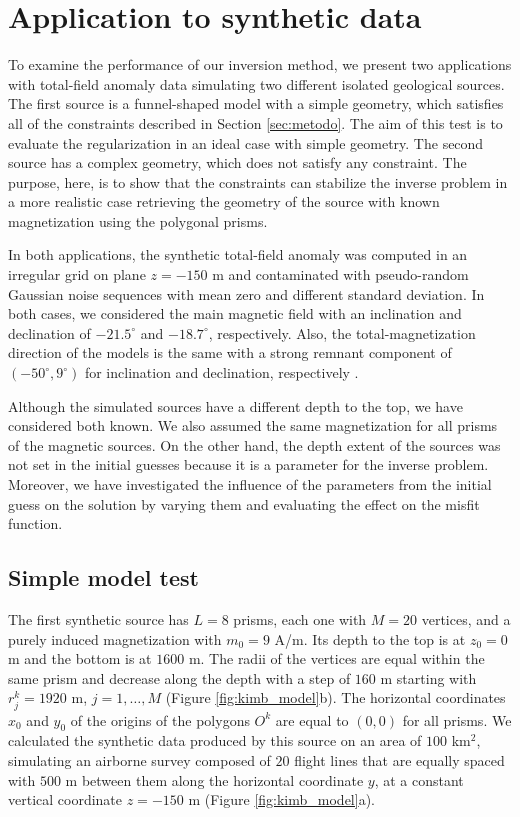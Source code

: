 \section{Application to synthetic data}

To examine the performance of our inversion method, we present two applications with total-field anomaly data simulating two different isolated geological sources. The first source is a funnel-shaped model with a simple geometry, which satisfies all of the constraints described in Section \ref{sec:metodo}. The aim of this test is to evaluate the regularization in an ideal case with simple geometry. The second source has a complex geometry, which does not satisfy any constraint. The purpose, here, is to show that the constraints can stabilize the inverse problem in a more realistic case retrieving the geometry of the source with known magnetization using the polygonal prisms.

In both applications, the synthetic total-field anomaly was computed in an irregular grid on plane $z=-150$ m and contaminated with pseudo-random Gaussian noise sequences with mean zero and different standard deviation. In both cases, we considered the main magnetic field with an inclination and declination of $-21.5^\circ$ and $-18.7^\circ$, respectively. Also, the total-magnetization direction of the models is the same with a strong remnant component of $(-50^\circ,9^\circ)$ for inclination and declination, respectively .

Although the simulated sources have a different depth to the top, we have considered both known. We also assumed the same magnetization for all prisms of the magnetic sources. On the other hand, the depth extent of the sources was not set in the initial guesses because it is a parameter for the inverse problem. Moreover, we have investigated the influence of the parameters from the initial guess on the solution by varying them and evaluating the effect on the misfit function.

\subsection{Simple model test}

The first synthetic source has $L=8$ prisms, each one with $M = 20$ vertices, and a purely induced magnetization with $m_0 = 9$ A/m. Its depth to the top is at $z_0=0$ m and the bottom is at $1600$ m. The radii of the vertices are equal within the same prism and decrease along the depth with a step of $160$ m starting with $r_j^k=1920$ m, $j=1,\dots, M$ (Figure \ref{fig:kimb_model}b). The horizontal coordinates $x_0$ and $y_0$ of the origins of the polygons $O^k$ are equal to $(0,0)$ for all prisms. We calculated the synthetic data produced by this source on an area of $100$ km$^2$, simulating an airborne survey composed of $20$ flight lines that are equally spaced with $500$ m between them along the horizontal coordinate $y$, at a constant vertical coordinate $z=-150$ m (Figure \ref{fig:kimb_model}a).

